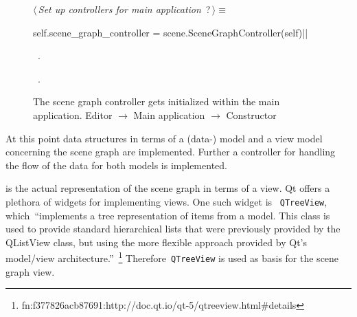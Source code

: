 \documentclass[%
    a4paper,    %
    justified,  %
    nobib,      %
    openany     %
]{tufte-book}
\begin{document}
\begin{figure}
\begin{flushleft} \small
\begin{minipage}{\linewidth}\label{scrap39}\raggedright\small
{} $\langle\,${\itshape Set up controllers for main application}\nobreak\ {\footnotesize {?}}$\,\rangle\equiv$
\vspace{-1ex}
\begin{pythoncode}
self.scene_graph_controller = scene.SceneGraphController(self)|\NWsep|
\end{pythoncode}
\vspace{1.5ex}
\footnotesize
\begin{list}{}{\setlength{\itemsep}{-\parsep}\setlength{\itemindent}{-\leftmargin}}
\item \NWtxtMacroDefBy\ .
\item \NWtxtMacroRefIn\ .

\item{}
\end{list}
\end{minipage}\vspace{4ex}
\end{flushleft}
\caption{The scene graph controller gets initialized within the main application.
  \newline{}\newline{}Editor $\rightarrow$ Main application $\rightarrow$
  Constructor}
\label{editor:lst:main-application:constructor:scene-graph-controller}
\end{figure}

At this point data structures in terms of a (data-) model and a view model
concerning the scene graph are implemented. Further a controller for handling
the flow of the data for both models is implemented.

 is the actual representation of the scene
graph in terms of a view. Qt offers a plethora of widgets for implementing
views. One such widget is ~\verb=QTreeView=, which~\enquote{implements a tree
representation of items from a model. This class is used to provide standard
hierarchical lists that were previously provided by the QListView class, but
using the more flexible approach provided by Qt's model/view
architecture.}~\footnote{fn:f377826acb87691:http://doc.qt.io/qt-5/qtreeview.html\#details}
Therefore~\verb=QTreeView= is used as basis for the scene graph view.
\end{document}
